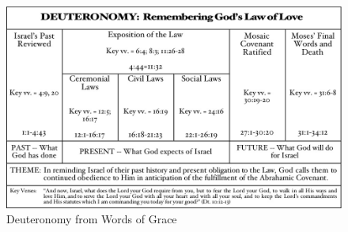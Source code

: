 \newpage
\begin{figure}
\begin{center}
\includegraphics[scale=1, angle=90]{05OT-Deuteronomy/References/WordsOfGrace-Deuteronomy.jpg}
\caption[Deuteronomy from Words of Grace]{Deuteronomy from Words of Grace}
\label{fig:Deuteronomy from Words of Grace}
\end{center}
\end{figure}




